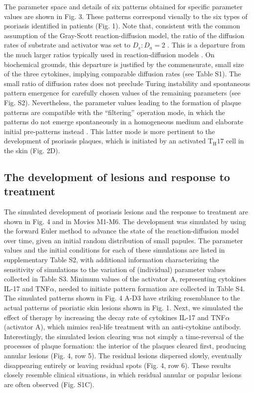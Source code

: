 The parameter space and details of six patterns obtained for specific parameter values are shown in Fig. 3. These patterns correspond visually to the six types of psoriasis identified in patients (Fig. 1). Note that, consistent with the common assumption of the Gray-Scott reaction-diffusion model, the ratio of the diffusion rates of substrate and activator was set to $D_s:D_a=2$ \citep{pearson1993}. This is a departure from the much larger ratios typically used in reaction-diffusion models \citep{diego2018, gierer1972, kondo2010, lengyel1991, marcon2016, vastano1987}. On biochemical grounds, this departure is justified by the commensurate, small size of the three cytokines, implying comparable diffusion rates (see Table S1). The small ratio of diffusion rates does not preclude Turing instability and spontaneous pattern emergence for carefully chosen values of the remaining parameters (see Fig. S2). Nevertheless, the  parameter values leading to the formation of plaque patterns are compatible with the ``filtering” operation mode, in which the patterns do not emerge spontaneously in a homogeneous medium and elaborate initial pre-patterns instead \citep{diego2018, lee1993, muratov2000, pearson1993}. This latter mode is more pertinent to the development of psoriasis plaques, which is initiated by an activated T$_{\text{H}}17$ cell in the skin (Fig. 2D). 

\subsection{The development of lesions and response to treatment}
The simulated development of psoriasis lesions and the response to treatment are shown in Fig. 4 and in Movies M1-M6. The development was simulated by using the forward Euler method to advance the state of the reaction-diffusion model over time, given an initial random distribution of small papules. The parameter values and the initial conditions for each of these simulations are listed in supplementary Table S2, with additional information characterizing the sensitivity of simulations to the variation of (individual) parameter values collected in Table S3. Minimum values of the activator A, representing cytokines IL-17 and TNF$\alpha$, needed to initiate pattern formation are collected in Table S4. The simulated patterns shown in Fig. 4 A-D3 have striking resemblance to the actual patterns of psoriatic skin lesions shown in Fig. 1. Next, we simulated the effect of therapy by increasing the decay rate of cytokines IL-17 and TNF$\alpha$ (activator A), which mimics real-life treatment with an anti-cytokine antibody. Interestingly, the simulated lesion clearing was not simply a time-reversal of the processes of plaque formation: the interior of the plaques cleared first, producing annular lesions (Fig. 4, row 5). The residual lesions dispersed slowly, eventually disappearing entirely or leaving residual spots (Fig. 4, row 6). These results closely resemble clinical situations, in which residual annular or papular lesions are often observed (Fig. S1C). 

